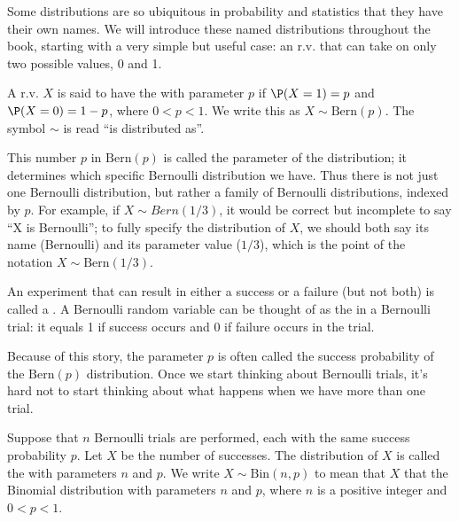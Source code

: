 \documentclass{ccg-topic}
\begin{document}
Some distributions are so ubiquitous in probability and statistics that they have their own names. We will introduce these named distributions throughout the book, starting with a very simple but useful case: an r.v. that can take on only two possible values, 0 and 1.

\newcommand{\Bern}{\mathrm{Bern}} 
\begin{defn}
    \label{defn:bernoulli_distribution}
    A r.v. $X$ is said to have the  with parameter $p$ if $\P(X = 1) = p$ and $\P(X=0) = 1-p$, where $0<p<1$. We write this as $X \sim \Bern(p)$. The symbol $\sim$ is read ``is distributed as''.
\end{defn}

\begin{note}
    \label{rem:families_of_distributions}
    This number $p$ in $\Bern(p)$ is called the parameter of the distribution; it determines which specific Bernoulli distribution we have. Thus there is not just one Bernoulli distribution, but rather a family of Bernoulli distributions, indexed by $p$. For example, if $X \sim Bern(1/3)$, it would be correct but incomplete to say ``X is Bernoulli''; to fully specify the distribution of $X$, we should both say its name (Bernoulli) and its parameter value ($1/3$), which is the point of the notation $X \sim \Bern(1/3)$.
\end{note}

\begin{defn}
    \label{defn:bernoulli_trial}
An experiment that can result in either a success or a failure (but not both) is called a . A Bernoulli random variable can be thought of as the  in a Bernoulli trial: it equals 1 if success occurs and 0 if failure occurs in the trial. 
\end{defn}

Because of this story, the parameter $p$ is often called the success probability of the $\Bern(p)$ distribution. Once we start thinking about Bernoulli trials, it’s hard not to start thinking about what happens when we have more than one trial.

\newcommand{\Bin}{\mathrm{Bin}} 

\begin{defn}
    \label{defn:binomial_distribution}
    Suppose that $n$  Bernoulli trials are performed, each with the same success probability $p$. Let $X$ be the number of successes. The distribution of $X$ is called the  with parameters $n$ and $p$. We write $X \sim \Bin(n,p)$ to mean that $X$ that the Binomial distribution with parameters $n$ and $p$, where $n$ is a positive integer and $0 < p< 1$.
\end{defn}
\end{document}
